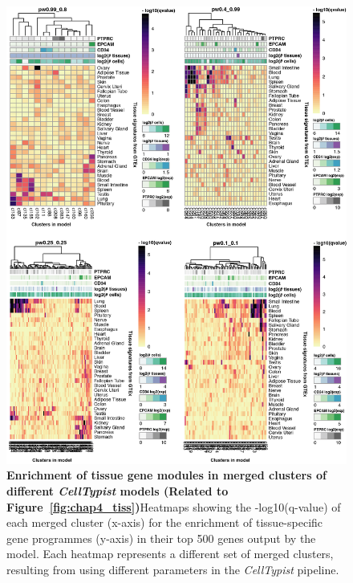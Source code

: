 \begin{figure}[ht!] 
\centering
\includegraphics[scale=0.78]{Appendix2/Figs/appB_clmGSEA.png} %
\caption[Enrichment of tissue gene modules in merged clusters of different \textit{CellTypist} models]{\textbf{Enrichment of tissue gene modules in merged clusters of different \textit{CellTypist} models (Related to Figure~\ref{fig:chap4_tiss})}\newline Heatmaps showing the -log10(q-value) of each merged cluster (x-axis) for the enrichment of tissue-specific gene programmes (y-axis) in their top 500 genes output by the model. Each heatmap represents a different set of merged clusters, resulting from using different parameters in the \textit{CellTypist} pipeline.}
\label{fig:appB_clmGSEA}
\end{figure}


